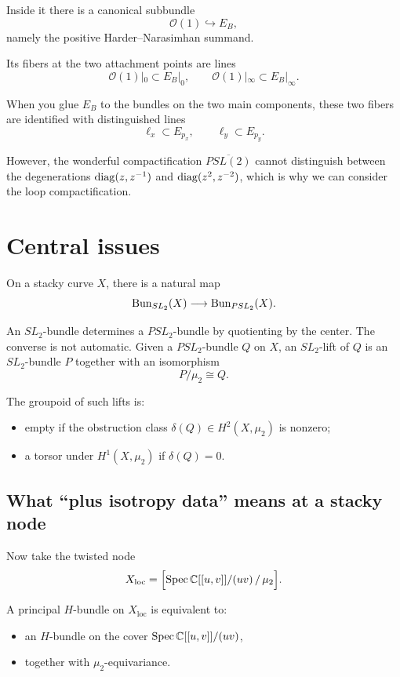 \documentclass[12pt]{article}
\begin{document}
Inside it there is a canonical subbundle
\[
\mathcal{O}(1) \hookrightarrow E_B,
\]
namely the positive Harder--Narasimhan summand.

Its fibers at the two attachment points are lines
\[
\mathcal{O}(1)|_0 \subset E_B|_0, \qquad \mathcal{O}(1)|_\infty \subset E_B|_\infty.
\]

When you glue $E_B$ to the bundles on the two main components, these two fibers are identified with distinguished lines
\[
\ell_x \subset E_{p_x}, \qquad \ell_y \subset E_{p_y}.
\]

However, the wonderful compactification $\overline{PSL(2)}$ cannot distinguish between the degenerations $\operatorname{diag}(z,z^{-1})$ and $\operatorname{diag}(z^{2},z^{-2})$, which is why we can consider the loop compactification.

\section{Central issues}

On a stacky curve $X$, there is a natural map
\[
\operatorname{Bun}_{SL_2}(X) \longrightarrow \operatorname{Bun}_{PSL_2}(X).
\]

An $SL_2$-bundle determines a $PSL_2$-bundle by quotienting by the center. The converse is not automatic. Given a $PSL_2$-bundle $Q$ on $X$, an $SL_2$-lift of $Q$ is an $SL_2$-bundle $P$ together with an isomorphism
\[
P/\mu_2 \cong Q.
\]

The groupoid of such lifts is:
\begin{itemize}
    \item empty if the obstruction class $\delta(Q) \in H^2(X, \mu_2)$ is nonzero;
    \item a torsor under $H^1(X, \mu_2)$ if $\delta(Q) = 0$.
\end{itemize}
\subsection{What ``plus isotropy data'' means at a stacky node}

Now take the twisted node
\[
X_{\mathrm{loc}} = \Bigl[\operatorname{Spec} \mathbb{C}[[u,v]]/(uv) \,/\, \mu_2\Bigr].
\]

A principal $H$-bundle on $X_{\mathrm{loc}}$ is equivalent to:
\begin{itemize}
    \item an $H$-bundle on the cover $\operatorname{Spec} \mathbb{C}[[u,v]]/(uv)$,
    \item together with $\mu_2$-equivariance.
\end{itemize}
\end{document}
